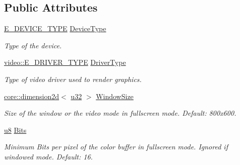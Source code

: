 \subsection*{Public Attributes}
\begin{DoxyCompactItemize}
\item 
\hyperlink{namespaceirr_ac25d94cf2e1037c7ca18ee79b3bd4505}{E\+\_\+\+D\+E\+V\+I\+C\+E\+\_\+\+T\+Y\+PE} \hyperlink{structirr_1_1SIrrlichtCreationParameters_a76520addbdf96ee3b3f00cb7f55076e5}{Device\+Type}
\begin{DoxyCompactList}\small\item\em Type of the device. \end{DoxyCompactList}\item 
\hyperlink{namespaceirr_1_1video_ae35a6de6d436c76107ad157fe42356d0}{video\+::\+E\+\_\+\+D\+R\+I\+V\+E\+R\+\_\+\+T\+Y\+PE} \hyperlink{structirr_1_1SIrrlichtCreationParameters_a1ea2f50c3b3a8eed6602a1a86e1cdf82}{Driver\+Type}
\begin{DoxyCompactList}\small\item\em Type of video driver used to render graphics. \end{DoxyCompactList}\item 
\mbox{\label{structirr_1_1SIrrlichtCreationParameters_a657cd4bc5a0b658d3fc9f4c7ef46fb47}} 
\hyperlink{classirr_1_1core_1_1dimension2d}{core\+::dimension2d}$<$ \hyperlink{namespaceirr_a0416a53257075833e7002efd0a18e804}{u32} $>$ \hyperlink{structirr_1_1SIrrlichtCreationParameters_a657cd4bc5a0b658d3fc9f4c7ef46fb47}{Window\+Size}
\begin{DoxyCompactList}\small\item\em Size of the window or the video mode in fullscreen mode. Default\+: 800x600. \end{DoxyCompactList}\item 
\mbox{\label{structirr_1_1SIrrlichtCreationParameters_a0f7480557670df2d954ae217732a8773}} 
\hyperlink{namespaceirr_a646874f69af8ff87fc10201b0254a761}{u8} \hyperlink{structirr_1_1SIrrlichtCreationParameters_a0f7480557670df2d954ae217732a8773}{Bits}
\begin{DoxyCompactList}\small\item\em Minimum Bits per pixel of the color buffer in fullscreen mode. Ignored if windowed mode. Default\+: 16. \end{DoxyCompactList}\item 

\end{DoxyCompactItemize}
